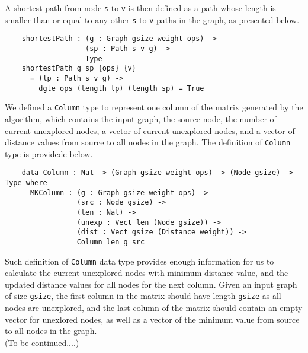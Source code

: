 A shortest path from node \texttt{s} to \texttt{v} is then defined as a path whose length is smaller than or equal to any other \texttt{s}-to-\texttt{v} paths in the graph, as presented below. 

\begin{lstlisting}
	shortestPath : (g : Graph gsize weight ops) ->
	               (sp : Path s v g) ->
	               Type
	shortestPath g sp {ops} {v}
	  = (lp : Path s v g) ->
	    dgte ops (length lp) (length sp) = True
\end{lstlisting}

We defined a \texttt{Column} type to represent one column of the matrix generated by the algorithm, which contains the input graph, the source node, the number of current unexplored nodes, a vector of current unexplored nodes, and a vector of distance values from source to all nodes in the graph. The definition of \texttt{Column} type is providede below. 

\begin{lstlisting}
	data Column : Nat -> (Graph gsize weight ops) -> (Node gsize) -> Type where
	  MKColumn : (g : Graph gsize weight ops) ->
	             (src : Node gsize) ->
	             (len : Nat) ->
	             (unexp : Vect len (Node gsize)) ->
	             (dist : Vect gsize (Distance weight)) ->
	             Column len g src

\end{lstlisting}
Such definition of \texttt{Column} data type provides enough information for us to calculate the current unexplored nodes with minimum distance value, and the updated distance values for all nodes for the next column. Given an input graph of size \texttt{gsize}, the first column in the matrix should have length \texttt{gsize} as all nodes are unexplored, and the last column of the matrix should contain an empty vector for unexlored nodes, as well as a vector of the minimum value from source to all nodes in the graph. 
\\


(To be continued....)
